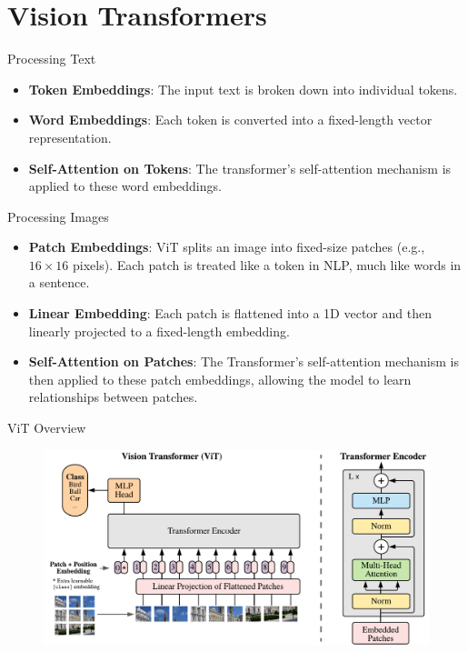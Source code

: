 \section{Vision Transformers}

\begin{frame}{Processing Text}
    \begin{itemize}
        \item \textbf{Token Embeddings}: The input text is broken down into individual tokens. 
	    \item \textbf{Word Embeddings}: Each token is converted into a fixed-length vector representation.
	    \item \textbf{Self-Attention on Tokens}: The transformer's self-attention mechanism is applied to these word embeddings. 
    \end{itemize}
\end{frame}

\begin{frame}{Processing Images}
    \begin{itemize}
        \item \textbf{Patch Embeddings}: ViT splits an image into fixed-size patches (e.g., $16\times16$ pixels). Each patch is treated like a token in NLP, much like words in a sentence.
	    \item \textbf{Linear Embedding}: Each patch is flattened into a 1D vector and then linearly projected to a fixed-length embedding.
	    \item \textbf{Self-Attention on Patches}: The Transformer’s self-attention mechanism is then applied to these patch embeddings, allowing the model to learn relationships between patches.
    \end{itemize}
\end{frame}

\begin{frame}{ViT Overview}
    \begin{figure}
        \centering
        \includegraphics[width=0.95\linewidth]{pic/model_scheme}
        \label{fig:vit-figure}
    \end{figure}
\end{frame}



